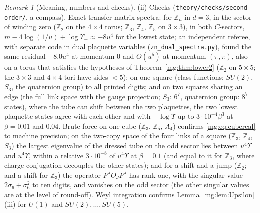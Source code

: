 \documentclass[11pt,a4paper]{article}
\theoremstyle{definition}
\theoremstyle{remark}
\newtheorem{remark}[theorem]{Remark}
\begin{document}
\begin{remark}[Meaning, numbers and checks]
(ii) Checks (\texttt{theory/checks/second-order/}, a compass). Exact transfer-matrix spectra: for $\mathbb Z_n$ in $d=3$, in the sector of winding zero
($\mathbb Z_2$ on the $4\times4$ torus; $\mathbb Z_3$, $\mathbb Z_4$, $\mathbb Z_5$ on $3\times3$), in both $C$-sectors, $m-4\log(1/u)+\log\Upsilon_\pm\approx-8u^4$ for
the lowest state; an independent referee, with separate code in dual plaquette variables (\texttt{zn\_dual\_spectra.py}), found the same residual $-8.0u^4$
at momentum $0$ and $O(u^5)$ at momentum $(\pi,\pi)$, also on a torus that satisfies the hypotheses of Theorem~\ref{mg:thm:lower2} ($\mathbb Z_2$ on $5\times5$;
the $3\times3$ and $4\times4$ tori have sides $<5$); on one square (class functions; $SU(2)$, $S_3$, the quaternion group) to all
printed digits; and on two squares sharing an edge (the full link space with the gauge projection; $S_3$: $6^7$, quaternion group: $8^7$ states), where the
tube can shift between the two plaquettes, the two lowest plaquette states agree with each other and with $-\log\Upsilon$ up to $3\cdot10^{-4}\beta^3$ at
$\beta=0.01$ and $0.04$. Brute force on one cube ($\mathbb Z_3$, $\mathbb Z_5$, $A_4$) confirms \eqref{mg:eq:cubereal} to machine precision;
on the two-copy space of the four links of a square ($\mathbb Z_3$, $\mathbb Z_4$, $S_3$) the largest eigenvalue of the dressed tube on the odd sector
lies between $u^4\Upsilon$ and $u^4\bar\Upsilon$, within a relative $3\cdot10^{-8}$ of $u^4\Upsilon$ at $\beta=0.1$ (and equal
to it for $\mathbb Z_3$, where charge conjugation decouples the other states); and for a shift and a jump ($\mathbb Z_2$; and a shift for $\mathbb Z_3$) the operator $P^JO_JP^J$ has rank one,
with the singular value $2\sigma_6+\sigma_6^2$ to ten digits, and vanishes on the odd sector (the other singular values are at the level of round-off). Weyl integration confirms Lemma~\ref{mg:lem:Upsilon}(iii) for
$U(1)$ and $SU(2),\dots,SU(5)$.


\end{remark}
\end{document}
